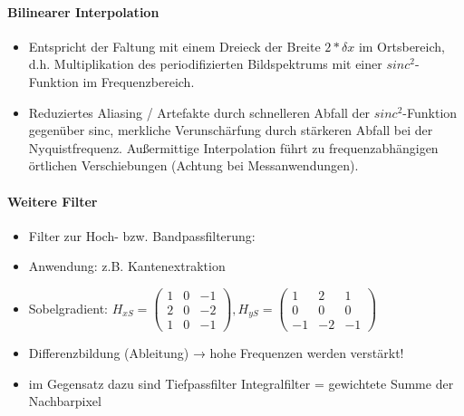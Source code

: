 \documentclass[10pt,landscape]{article}
\begin{document}
\begin{multicols}{3}
\paragraph{Bilinearer Interpolation}
\begin{itemize}
  \item Entspricht der Faltung mit einem Dreieck der Breite $2*\delta x$ im Ortsbereich, d.h. Multiplikation des periodifizierten Bildspektrums mit einer $sinc^2$-Funktion im Frequenzbereich.
  \item Reduziertes Aliasing / Artefakte durch schnelleren Abfall der $sinc^2$-Funktion gegenüber sinc, merkliche Verunschärfung durch stärkeren Abfall bei der Nyquistfrequenz. Außermittige Interpolation führt zu frequenzabhängigen örtlichen Verschiebungen (Achtung bei Messanwendungen).
\end{itemize}

\paragraph{Weitere Filter}
\begin{itemize}
  \item Filter zur Hoch- bzw. Bandpassfilterung:
  \item Anwendung: z.B. Kantenextraktion
  \item Sobelgradient: $H_{xS} =\begin{pmatrix} 1&0&-1\\ 2&0&-2\\ 1&0&-1\end{pmatrix}, H_{yS}=\begin{pmatrix} 1&2&1\\ 0&0&0\\ -1&-2&-1 \end{pmatrix}$
  \item Differenzbildung (Ableitung) → hohe Frequenzen werden verstärkt!
  \item im Gegensatz dazu sind Tiefpassfilter Integralfilter = gewichtete Summe der Nachbarpixel
\end{itemize}


\end{multicols}
\end{document}
